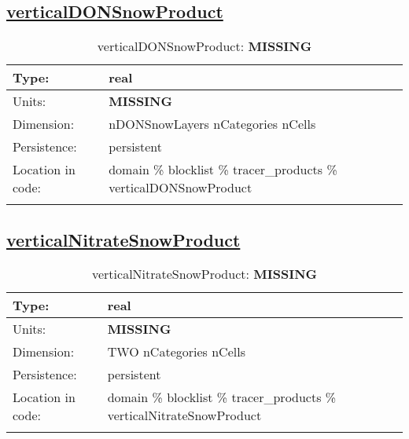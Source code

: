\subsection[verticalDONSnowProduct]{\hyperref[sec:var_tab_tracer_products]{verticalDONSnowProduct}}
\label{subsec:var_sec_tracer_products_verticalDONSnowProduct}
\begin{center}
\begin{longtable}{| p{2.0in} | p{4.0in} |}
        \hline 
        Type: & real \\
        \hline 
        Units: & {\bf \color{red} MISSING} \\
        \hline 
        Dimension: & nDONSnowLayers nCategories nCells \\
        \hline 
        Persistence: & persistent \\
        \hline 
         Location in code: & domain \% blocklist \% tracer\_products \% verticalDONSnowProduct \\
         \hline 
    \caption{verticalDONSnowProduct: {\bf \color{red} MISSING}}
\end{longtable}
\end{center}
\subsection[verticalNitrateSnowProduct]{\hyperref[sec:var_tab_tracer_products]{verticalNitrateSnowProduct}}
\label{subsec:var_sec_tracer_products_verticalNitrateSnowProduct}
\begin{center}
\begin{longtable}{| p{2.0in} | p{4.0in} |}
        \hline 
        Type: & real \\
        \hline 
        Units: & {\bf \color{red} MISSING} \\
        \hline 
        Dimension: & TWO nCategories nCells \\
        \hline 
        Persistence: & persistent \\
        \hline 
         Location in code: & domain \% blocklist \% tracer\_products \% verticalNitrateSnowProduct \\
         \hline 
    \caption{verticalNitrateSnowProduct: {\bf \color{red} MISSING}}
\end{longtable}
\end{center}
